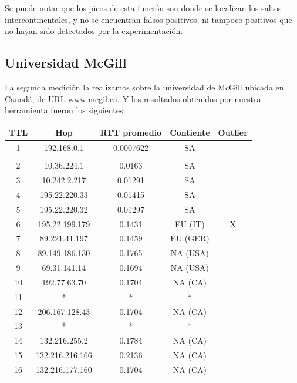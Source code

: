\documentclass[a4paper,10pt]{article}
\begin{document}
\medskip
\par{Se puede notar que los picos de esta función son donde se localizan los saltos intercontinentales, y no se encuentran falsos positivos, ni tampoco positivos que no hayan sido detectados por la experimentación.}



\medskip
\medskip
\medskip


\subsection{Universidad McGill}
\medskip
\par{La segunda medición la realizamos sobre la universidad de McGill ubicada en Canadá, de URL www.mcgil.ca. Y los resultados obtenidos por nuestra herramienta fueron los siguientes: }

\medskip

\begin{center}
\begin{tabular}{|c | c | c || c | c |}
    \hline
    TTL & Hop & RTT promedio & Contiente & Outlier \\ \hline
1 & 192.168.0.1 & 0.0007622& SA &   \\ \hline \\ \hline
2 & 10.36.224.1 & 0.0163& SA &   \\ \hline
3 & 10.242.2.217 & 0.01291& SA &   \\ \hline
4 & 195.22.220.33 & 0.01415& SA &   \\ \hline
5 & 195.22.220.32 & 0.01297& SA &   \\ \hline
6 & 195.22.199.179 & 0.1431& EU (IT) & X \\ \hline
7 & 89.221.41.197 & 0.1459& EU (GER) &   \\ \hline
8 & 89.149.186.130 & 0.1765& NA (USA) &   \\ \hline
9 & 69.31.141.14 & 0.1694& NA (USA) &   \\ \hline
10 & 192.77.63.70 & 0.1704& NA (CA) &   \\ \hline
11 & * & * & * &  \\ \hline
12 & 206.167.128.43 & 0.1704& NA (CA) &   \\ \hline
13 & * & * & * &  \\ \hline
14 & 132.216.255.2 & 0.1784& NA (CA) &   \\ \hline
15 & 132.216.216.166 & 0.2136& NA (CA) &   \\ \hline
16 & 132.216.177.160 & 0.1704& NA (CA) &   \\ \hline
    
  
\end{tabular}
\end{center}
\end{document}
